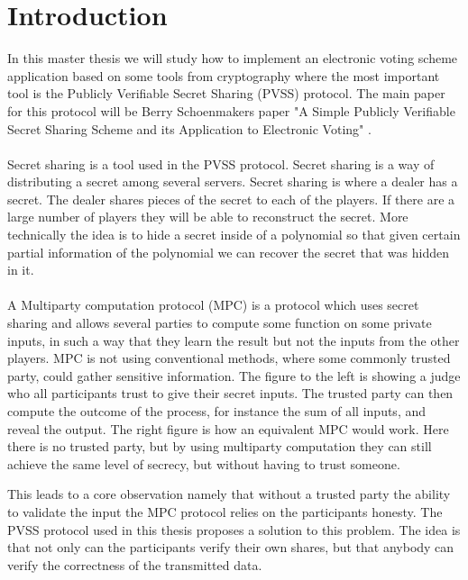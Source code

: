 \section{Introduction}
In this master thesis we will study how to implement an  electronic voting scheme application based on some tools from cryptography where the most important tool is the Publicly Verifiable Secret Sharing (PVSS) protocol. The main paper for this protocol will be Berry Schoenmakers paper "A Simple Publicly Verifiable Secret Sharing Scheme and its Application to Electronic Voting" \cite{Schoenmakers1999}. \\\\
\noindent
Secret sharing is a tool used in the PVSS protocol. Secret sharing is a way of distributing a secret among several servers. Secret sharing is where a dealer has a secret. The dealer shares pieces of the secret to each of the players. If there are a large number of players they will be able to reconstruct the secret. More technically the idea is to hide a secret inside of a polynomial so that given certain partial information of the polynomial we can recover the secret that was hidden in it.\\\\
\noindent
A Multiparty computation protocol (MPC) is a protocol which uses secret sharing and allows several parties to compute some function on some private inputs, in such a way that they learn the result but not the inputs from the other players. MPC is not using conventional methods, where some commonly trusted party, could gather sensitive information. The figure to the left is showing a judge who all participants trust to give their secret inputs. The trusted party can then compute the outcome of the process, for instance the sum of all inputs, and reveal the output. The right figure is how an equivalent MPC would work. Here there is no trusted party, but by using multiparty computation they can still achieve the same level of secrecy, but without having to trust someone.
 
\begin{center}
\end{center}

\noindent
This leads to a core observation namely that without a trusted party the ability to validate the input the MPC protocol relies on the participants honesty. 
The PVSS protocol used in this thesis proposes a solution to this problem. The idea is that not only can the participants verify their own shares, but that anybody can verify the correctness of the transmitted data.